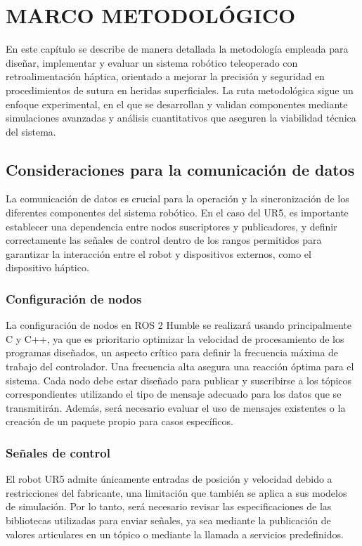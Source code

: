 \chapter{MARCO METODOLÓGICO}

En este capítulo se describe de manera detallada la metodología empleada para diseñar, implementar y evaluar un sistema robótico teleoperado con retroalimentación háptica, orientado a mejorar la precisión y seguridad en procedimientos de sutura en heridas superficiales. La ruta metodológica sigue un enfoque experimental, en el que se desarrollan y validan componentes mediante simulaciones avanzadas y análisis cuantitativos que aseguren la viabilidad técnica del sistema.


\section{Consideraciones para la comunicación de datos}

La comunicación de datos es crucial para la operación y la sincronización de los diferentes componentes del sistema robótico. En el caso del UR5, es importante establecer una dependencia entre nodos suscriptores y publicadores, y definir correctamente las señales de control dentro de los rangos permitidos para garantizar la interacción entre el robot y dispositivos externos, como el dispositivo háptico.

\subsection{Configuración de nodos}
La configuración de nodos en ROS 2 Humble se realizará usando principalmente C y C++, ya que es prioritario optimizar la velocidad de procesamiento de los programas diseñados, un aspecto crítico para definir la frecuencia máxima de trabajo del controlador. Una frecuencia alta asegura una reacción óptima para el sistema. Cada nodo debe estar diseñado para publicar y suscribirse a los tópicos correspondientes utilizando el tipo de mensaje adecuado para los datos que se transmitirán. Además, será necesario evaluar el uso de mensajes existentes o la creación de un paquete propio para casos específicos.

\subsection{Señales de control}
El robot UR5 admite únicamente entradas de posición y velocidad debido a restricciones del fabricante, una limitación que también se aplica a sus modelos de simulación. Por lo tanto, será necesario revisar las especificaciones de las bibliotecas utilizadas para enviar señales, ya sea mediante la publicación de valores articulares en un tópico o mediante la llamada a servicios predefinidos.

